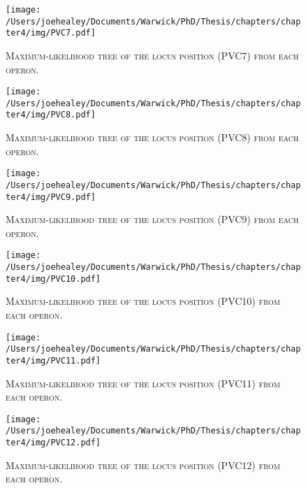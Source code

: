 \newpage

\begin{figure}[h!]
	\centering
	\texttt{[image: /Users/joehealey/Documents/Warwick/PhD/Thesis/chapters/chapter4/img/PVC7.pdf]}
	\captionsetup{singlelinecheck=off, justification=justified, font=footnotesize, aboveskip=19pt}
	\caption[Gene tree for the seventh PVC locus]{\textsc{\normalsize Maximum-likelihood tree of the locus position (PVC7) from each operon.}}
	\label{pvc7tree}
\end{figure}
\hfill
\begin{figure}[h!]
	\centering
	\texttt{[image: /Users/joehealey/Documents/Warwick/PhD/Thesis/chapters/chapter4/img/PVC8.pdf]}
	\captionsetup{singlelinecheck=off, justification=justified, font=footnotesize, aboveskip=19pt}
	\caption[Gene tree for the eighth PVC locus]{\textsc{\normalsize Maximum-likelihood tree of the locus position (PVC8) from each operon.}}
	\label{pvc8tree}
\end{figure}

\newpage
\begin{figure}[h!]
	\centering
	\texttt{[image: /Users/joehealey/Documents/Warwick/PhD/Thesis/chapters/chapter4/img/PVC9.pdf]}
	\captionsetup{singlelinecheck=off, justification=justified, font=footnotesize, aboveskip=19pt}
	\caption[Gene tree for the ninth PVC locus]{\textsc{\normalsize Maximum-likelihood tree of the locus position (PVC9) from each operon.}}
	\label{pvc9tree}
\end{figure}
\hfill
\begin{figure}[h!]
	\centering
	\texttt{[image: /Users/joehealey/Documents/Warwick/PhD/Thesis/chapters/chapter4/img/PVC10.pdf]}
	\captionsetup{singlelinecheck=off, justification=justified, font=footnotesize, aboveskip=19pt}
	\caption[Gene tree for the tenth PVC locus]{\textsc{\normalsize Maximum-likelihood tree of the locus position (PVC10) from each operon.}}
	\label{pvc10tree}
\end{figure}

\newpage
\begin{figure}[h!]
	\centering
	\texttt{[image: /Users/joehealey/Documents/Warwick/PhD/Thesis/chapters/chapter4/img/PVC11.pdf]}
	\captionsetup{singlelinecheck=off, justification=justified, font=footnotesize, aboveskip=19pt}
	\caption[Gene tree for the eleventh PVC locus]{\textsc{\normalsize Maximum-likelihood tree of the locus position (PVC11) from each operon.}}
	\label{pvc11tree}
\end{figure}
\hfill
\begin{figure}[h!]
	\centering
	\texttt{[image: /Users/joehealey/Documents/Warwick/PhD/Thesis/chapters/chapter4/img/PVC12.pdf]}
	\captionsetup{singlelinecheck=off, justification=justified, font=footnotesize, aboveskip=19pt}
	\caption[Gene tree for the twelfth PVC locus]{\textsc{\normalsize Maximum-likelihood tree of the locus position (PVC12) from each operon.}}
	\label{pvc12tree}
\end{figure}


